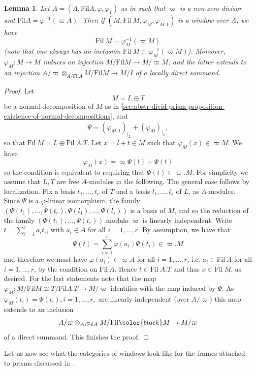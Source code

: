 \documentclass{amsart}
\theoremstyle{plain}
\newtheorem{lemma}[theorem]{Lemma}
\theoremstyle{definition}
\newcommand{\Fil}{\mathrm{Fil}}
\newcommand{\green}[1]{{\color{black}#1}}
\newcommand{\blue}[1]{{\color{black}#1}}
\begin{document}
{\begin{lemma}
\label{filtration-must-be-the-pullback-by-frobenius}
Let $\underline{A}=(A,\Fil A, \varphi,\varphi_1)$ as in  such that $\varpi$ is a non-zero divisor and $\Fil A= \varphi^{-1}(\varpi A)$. Then if $(M, \Fil~ M, \varphi_M, \varphi_{M,1})$ is a window over $\underline{A}$, we have
$$
\Fil ~ M = \varphi_M^{-1}(\varpi M)
$$
(note that one always has an inclusion $\Fil ~ M \subset \varphi_M^{-1}(\varpi M)$). \green{Moreover, $\varphi_M\colon M\to M$ induces an injection $M/\Fil M\to M/\varpi M$, and the latter extends to an injection $A/\varpi\otimes_{A/\Fil A} M/\Fil M\to M/I$ of a locally direct summand.} 
\end{lemma} 
\begin{proof}
Let
$$
M=L \oplus T
$$
be a normal decomposition of $M$ as in \ref{sec:abstr-divid-prism-proposition-existence-of-normal-decompositions}, and
$$
\Psi= (\varphi_{M,1})_{|_L} + (\varphi_{M})_{|_T},
$$
 so that $\Fil ~ M= L \oplus \Fil~ A.T$. Let $x=l+t \in M$ such that $\varphi_M(x) \in \varpi M$. We have 
$$
\varphi_M(x) = \varpi \Psi(l) + \Psi(t)
$$ 
so the condition is equivalent to requiring that $\Psi(t) \in \varpi. M$. \green{For simplicity we assume that $L, T$ are free $A$-modules in the following. The general case follows by localization.} Fix a basis $t_1,\dots,t_r$ of $T$ and a basis $l_1,\dots,l_s$ of $L$, as $A$-modules. Since $\Psi$ is a $\varphi$-linear isomorphism, the family $(\Psi(t_1),\dots,\Psi(t_r),\Psi(l_1),\dots,\Psi(l_s))$ is a basis of $M$, and so the reduction of the family $(\Psi(t_1),\dots,\Psi(t_r))$ modulo $\varpi$ is linearly independent. Write $t=\sum_{i=1}^r a_i t_i$, with $a_i \in A$ for all $i=1,\dots, r$. By assumption, we have that
$$
\Psi(t) = \sum_{i=1}^r \varphi(a_i) \Psi(t_i) \in \varpi. M
$$
and therefore we must have $\varphi(a_i) \in \varpi A$ for all $i=1,\dots,r$, i.e. $a_i \in \Fil ~A$ for all $i=1,\dots,r$, by the condition on $\Fil~A$. Hence $t \in \Fil~A.T$ and thus $x \in \Fil~M$, as desired.
\green{For the last statements note that the map $\varphi_M\colon M/\Fil M\cong T/\Fil A.T\to M/\varpi$ identifies with the map induced by $\Psi$. As $\varphi_M(t_i)=\Psi(t_i), i=1,\ldots, r,$ are linearly independent (over $A/\varpi$) this map extends to an inclusion
  \[
    A/\varpi\otimes_{A/\Fil A} M/\Fil \blue{M} \to M/\varpi
  \]
  of a direct summand. This finishes the proof.}
  \end{proof}



Let us now see what the categories of windows look like for the frames attached to prisms discussed in .}
\end{document}
